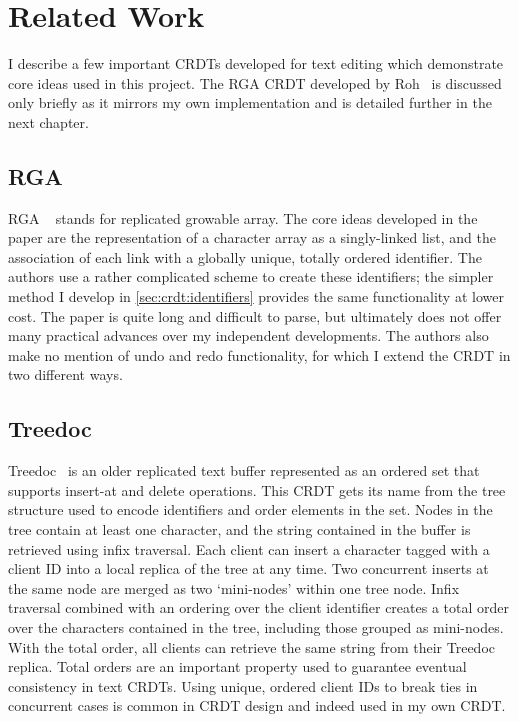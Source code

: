 \documentclass[12pt,a4paper,twoside,openright]{report}
\begin{document}
\section{Related Work} \label{sec:relatedwork}

I describe a few important CRDTs developed for text editing which demonstrate core ideas used in this project. The RGA CRDT developed by Roh~\cite{roh2011replicated} is discussed only briefly as it mirrors my own implementation and is detailed further in the next chapter.

\subsection{RGA}
RGA ~\cite{roh2011replicated} stands for replicated growable array. The core ideas developed in the paper are the representation of a character array as a singly-linked list, and the association of each link with a globally unique, totally ordered identifier. The authors use a rather complicated scheme to create these identifiers; the simpler method I develop in \cref{sec:crdt:identifiers} provides the same functionality at lower cost. The paper is quite long and difficult to parse, but ultimately does not offer many practical advances over my independent developments. The authors also make no mention of undo and redo functionality, for which I extend the CRDT in two different ways.

\subsection{Treedoc}

Treedoc~\cite{preguica2009} is an older replicated text buffer represented as an ordered set that supports insert-at and delete operations. This CRDT gets its name from the tree structure used to encode identifiers and order elements in the set. Nodes in the tree contain at least one character, and the string contained in the buffer is retrieved using infix traversal. Each client can insert a character tagged with a client ID into a local replica of the tree at any time. Two concurrent inserts at the same node are merged as two `mini-nodes' within one tree node. Infix traversal combined with an ordering over the client identifier creates a total order over the characters contained in the tree, including those grouped as mini-nodes. With the total order, all clients can retrieve the same string from their Treedoc replica. Total orders are an important property used to guarantee eventual consistency in text CRDTs. Using unique, ordered client IDs to break ties in concurrent cases is common in CRDT design and indeed used in my own CRDT.
\end{document}
